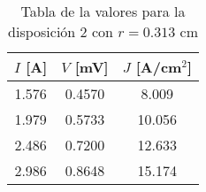 \begin{table}[h!]
    \centering
\begin{tabular}{ccc}
\toprule
$I$ [A] & $V$ [mV] & $J$ [A/cm$^2$] \\
\midrule
1.576 & 0.4570 & 8.009 \\
1.979 & 0.5733 & 10.056 \\
2.486 & 0.7200 & 12.633 \\
2.986 & 0.8648 & 15.174 \\
\bottomrule
\end{tabular}
    \caption{Tabla de la valores para la disposición 2 con $r=0.313$ cm}
    \label{Tab:VIJ_2}
\end{table}
